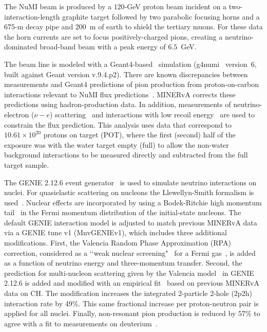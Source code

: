 \documentclass[aps,prl,twocolumn,superscriptaddress,nofootinbib]{revtex4}
\begin{document}
The NuMI beam is produced by a $120$-GeV proton beam incident on a two-interaction-length graphite target followed by two parabolic focusing horns and a $675$-m decay pipe and 200~m of earth to shield the tertiary muons. For these data the horn currents are set to focus positively-charged pions, creating a neutrino-dominated broad-band beam with a peak energy of $6.5$~GeV.

The beam line is modeled with a Geant4-based~\cite{Agostinelli:2002hh,Allison:2006ve}  simulation (g4numi~\cite{Aliaga:2016oaz} version~6, built against Geant version v.9.4.p2). There are known discrepancies between measurements and Geant4 predictions of pion production from proton-on-carbon interactions relevant to NuMI flux predictions~\cite{Aliaga:2016oaz}. MINERvA corrects these predictions using hadron-production data. In addition, measurements of neutrino-electron ($\nu-e$) scattering~\cite{MINERvA:2019mkf} and interactions with low recoil energy~\cite{MINERvA:2021mpk} are used to constrain the flux prediction.  This analysis uses data that correspond to $10.61\times 10^{20}$ protons on target (POT), where the first (second) half of the exposure was with the water target empty (full) to allow the non-water background interactions to be measured directly and subtracted from the full target sample.  
 
The GENIE 2.12.6 event generator~\cite{Andreopoulos:2009rq} is used to simulate neutrino interactions on nuclei.  For quasielastic scattering on nucleons the Llewellyn-Smith formalism is used~\cite{Llewellyn:1972}.  Nuclear effects are incorporated by using a Bodek-Ritchie high momentum tail~\cite{Bodek:1981wr} in the Fermi momentum distribution of the initial-state nucleons.  
The default GENIE interaction model is adjusted to match previous MINERvA data via a GENIE tune v1 (MnvGENIEv1), which includes three additional modifications.  First, the Valencia Random Phase Approximation (RPA) correction, considered as a \lq\lq weak nuclear screening"~\cite{Nieves:2004wx,Gran:2017psn} for a Fermi gas~\cite{Martini:2009,Nieves:2017lij}, is added as a function of neutrino energy and three-momentum transfer.  Second, the prediction for multi-nucleon scattering given by the Valencia model~\cite{Nieves:2011pp,Gran:2013kda,Schwehr:2016pvn} in GENIE 2.12.6 is added and modified with an empirical fit~\cite{Rodrigues:2015hik} based on previous MINERvA data on CH. The modification increases the integrated 2-particle 2-hole (2p2h) interaction rate by 49\%.  This same fractional increase per proton-neutron pair is applied for all nuclei.  
Finally, non-resonant pion production is reduced by $57\%$ to agree with a fit to measurements  
on deuterium~\cite{Rodrigues:2016xjj}. 
\end{document}
